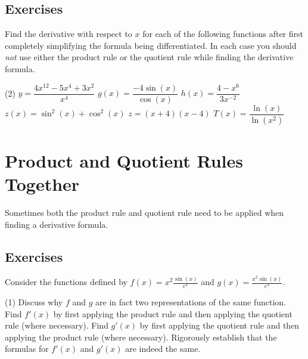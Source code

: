 \documentclass[10pt,oneside,]{book}
\theoremstyle{plain}
\theoremstyle{definition}
\numberwithin{equation}{section}
\newcommand{\fe}[2]{#1\mathopen{}\left(#2\right)\mathclose{}}
\newcommand{\fd}[1]{#1'}
\begin{document}
\subsection[Exercises]{Exercises}\label{exercises-39}
\hypertarget{exercisegroup-80}{\null}Find the derivative with respect to \(x\) for each of the following functions after first completely simplifying the formula being differentiated.  In each case you should \emph{not} use either the product rule or the quotient rule while finding the derivative formula.%
\par
\begin{exercisegroup}(2)
\exercise[1.]\hypertarget{exercise-385}{\null}\(y=\dfrac{4x^{12}-5x^4+3x^2}{x^4}\)%
\exercise[2.]\hypertarget{exercise-386}{\null}\(\fe{g}{x}=\dfrac{-4\fe{\sin}{x}}{\fe{\cos}{x}}\)%
\exercise[3.]\hypertarget{exercise-387}{\null}\(\fe{h}{x}=\dfrac{4-x^6}{3x^{-2}}\)%
\exercise[4.]\hypertarget{exercise-388}{\null}\(\fe{z}{x}=\fe{\sin^2}{x}+\fe{\cos^2}{x}\)%
\exercise[5.]\hypertarget{exercise-389}{\null}\(z=(x+4)(x-4)\)%
\exercise[6.]\hypertarget{exercise-390}{\null}\(\fe{T}{x}=\dfrac{\fe{\ln}{x}}{\fe{\ln}{x^2}}\)%
\end{exercisegroup}
\par\smallskip\noindent
\typeout{************************************************}
\typeout{************************************************}
\section[Product, Quotient Rules Together]{Product and Quotient Rules Together}\label{section-product-and-quotient-together}
Sometimes both the product rule and quotient rule need to be applied when finding a derivative formula.%
\typeout{************************************************}
\typeout{************************************************}
\subsection[Exercises]{Exercises}\label{exercises-40}
\hypertarget{exercisegroup-81}{\null}Consider the functions defined by \(\fe{f}{x}=x^2\frac{\fe{\sin}{x}}{e^x}\) and \(\fe{g}{x}=\frac{x^2\fe{\sin}{x}}{e^x}\).%
\par
\begin{exercisegroup}(1)
\exercise[1.]\hypertarget{exercise-391}{\null}Discuss why \(f\) and \(g\) are in fact two representations of the same function.%
\exercise[2.]\hypertarget{exercise-392}{\null}Find \(\fe{\fd{f}}{x}\) by first applying the product rule and then applying the quotient rule (where necessary).%
\exercise[3.]\hypertarget{exercise-393}{\null}Find \(\fe{\fd{g}}{x}\) by first applying the quotient rule and then applying the product rule (where necessary).%
\exercise[4.]\hypertarget{exercise-394}{\null}Rigorously establish that the formulas for \(\fe{\fd{f}}{x}\) and \(\fe{\fd{g}}{x}\) are indeed the same.%
\end{exercisegroup}
\par\smallskip\noindent
\typeout{************************************************}
\typeout{************************************************}
\end{document}
